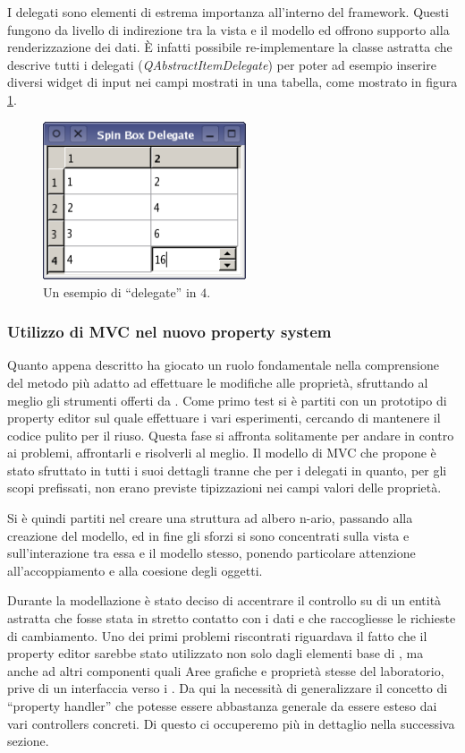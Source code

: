 I delegati sono elementi di estrema importanza all'interno del framework. Questi fungono da livello di indirezione tra la vista e il modello ed offrono supporto alla renderizzazione dei dati. È infatti possibile re-implementare la classe astratta che descrive tutti i delegati (\emph{QAbstractItemDelegate}) per poter ad esempio inserire diversi widget di input nei campi mostrati in una tabella, come mostrato in figura \ref{figura:qt_delegate}.

\begin{figure}[!htb]
	\centering
	\includegraphics[width=6cm]{images/spinboxdelegate-example.png}
	\caption{Un esempio di ``delegate'' in \qt{}$4$.}
	\label{figura:qt_delegate}
\end{figure}

\subsubsection*{Utilizzo di MVC nel nuovo property system}
Quanto appena descritto ha giocato un ruolo fondamentale nella comprensione del metodo più adatto ad effettuare le modifiche alle proprietà, sfruttando al meglio gli strumenti offerti da \qt{}. Come primo test si è partiti con un prototipo di property editor sul quale effettuare i vari esperimenti, cercando di mantenere il codice pulito per il riuso.
Questa fase si affronta solitamente per andare in contro ai problemi, affrontarli e risolverli al meglio. Il modello di MVC che \qt{} propone è stato sfruttato in tutti i suoi dettagli tranne che per i delegati in quanto, per gli scopi prefissati, non erano previste tipizzazioni nei campi valori delle proprietà.

Si è quindi partiti nel creare una struttura ad albero n-ario, passando alla creazione del modello, ed in fine gli sforzi si sono concentrati sulla vista e sull'interazione tra essa e il modello stesso, ponendo particolare attenzione all'accoppiamento e alla coesione degli oggetti.

Durante la modellazione è stato deciso di accentrare il controllo su di un entità astratta che fosse stata in stretto contatto con i dati e che raccogliesse le richieste di cambiamento. Uno dei primi problemi riscontrati riguardava il fatto che il property editor sarebbe stato utilizzato non solo dagli elementi base di \visualnetkit{}, ma anche ad altri componenti quali Aree grafiche e proprietà stesse del laboratorio, prive di un interfaccia verso i \plugin{}. Da qui la necessità di generalizzare il concetto di ``property handler'' che potesse essere abbastanza generale da essere esteso dai vari controllers concreti. Di questo ci occuperemo più in dettaglio nella successiva sezione.

